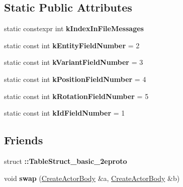\subsection*{Static Public Attributes}
\begin{DoxyCompactItemize}
\item 
static constexpr int {\bfseries k\+Index\+In\+File\+Messages}
\item 
\mbox{\label{classtbBasics_1_1CreateActorBody_a29209fbcdeba105c318b4aaaef6868ab}} 
static const int {\bfseries k\+Entity\+Field\+Number} = 2
\item 
\mbox{\label{classtbBasics_1_1CreateActorBody_a93c5b2b328fcecb7beb7db7a13309a66}} 
static const int {\bfseries k\+Variant\+Field\+Number} = 3
\item 
\mbox{\label{classtbBasics_1_1CreateActorBody_ab6d8e4b96c318bf56dea31337e395948}} 
static const int {\bfseries k\+Position\+Field\+Number} = 4
\item 
\mbox{\label{classtbBasics_1_1CreateActorBody_a2318605d16675db083d9209f2abb7d0a}} 
static const int {\bfseries k\+Rotation\+Field\+Number} = 5
\item 
\mbox{\label{classtbBasics_1_1CreateActorBody_a87e64026c0c6ec2033363cf090505589}} 
static const int {\bfseries k\+Id\+Field\+Number} = 1
\end{DoxyCompactItemize}
\subsection*{Friends}
\begin{DoxyCompactItemize}
\item 
\mbox{\label{classtbBasics_1_1CreateActorBody_ae86a2f4c520666b65d606ccbe2122e61}} 
struct {\bfseries \+::\+Table\+Struct\+\_\+basic\+\_\+2eproto}
\item 
\mbox{\label{classtbBasics_1_1CreateActorBody_ae26a9b33544b5d0a394cdf0d91afc17b}} 
void {\bfseries swap} (\hyperlink{classtbBasics_1_1CreateActorBody}{Create\+Actor\+Body} \&a, \hyperlink{classtbBasics_1_1CreateActorBody}{Create\+Actor\+Body} \&b)
\end{DoxyCompactItemize}


